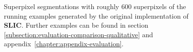 \begin{figure}[t]
{	}
	\caption[Superpixel segmentations generated by the original implementation of \textbf{SLIC} \cite{AchantaShajiSmithLucchiFuaSuesstrunk:2012}.]{Superpixel segmentations with roughly $600$ superpixels of the running examples generated by the original implementation of \textbf{SLIC}. Further examples can be found in section \ref{subsection:evaluation-comparison-qualitative} and appendix~\ref{chapter:appendix-evaluation}.}
	\label{fig:superpixel-segmentation-slic-results}
\end{figure}